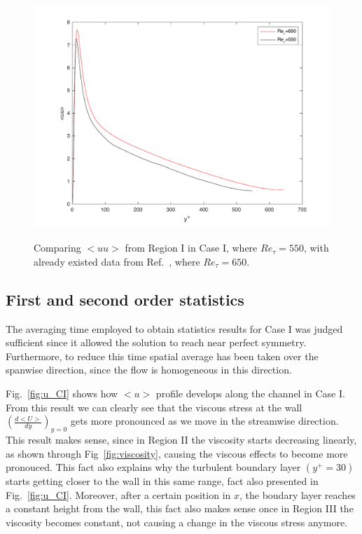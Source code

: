 \documentclass[twocolumn,10pt]{asme2e}
\begin{document}
\begin{figure}[t]
\centering
\scalebox{0.5}
{\includegraphics{comparing_uu.pdf}}
\caption{Comparing \(<uu>\) from Region I in Case I, where \(Re_{\tau}=550\), with already existed data from Ref.~\cite{iwamoto2002}, where \(Re_{\tau}=650\).}
\label{fig:comparing_uu}
\end{figure}

\subsection*{First and second order statistics}

The averaging time employed to obtain statistics results for Case I was judged sufficient since it allowed the solution to reach near perfect symmetry. Furthermore, to reduce this time spatial average has been taken over the spanwise direction, since the flow is homogeneous in this direction.

Fig.~\ref{fig:u_CI}  shows how \(<u>\) profile develops along the channel in Case I. From this result we can clearly see that the viscous stress at the wall \(\left(\frac{d<U>}{dy}\right)_{y=0}\) gets more pronounced as we move in the streamwise direction. This result makes sense, since in Region II the viscosity starts decreasing linearly, as shown through Fig~\ref{fig:viscosity}, causing the viscous effects to become more pronouced. This fact also explains why the turbulent boundary layer \((y^+=30)\) starts getting closer to the wall in this same range, fact also presented in Fig.~\ref{fig:u_CI}. Moreover, after a certain position in \(x\), the boudary layer reaches a constant height from the wall, this fact also makes sense once in Region III the viscosity becomes constant, not causing a change in the viscous stress anymore.
\end{document}
